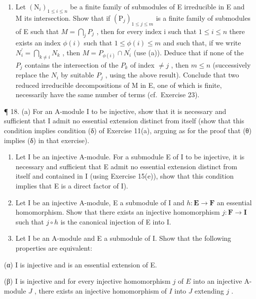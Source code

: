 \begin{enumerate}
\def\labelenumi{(\alph{enumi})}
\setcounter{enumi}{1}
\tightlist
\item
  Let \((\mathrm{N}_{i})_{1\leqslant i\leqslant n}\) be a finite family of submodules of E irreducible in E and M its intersection. Show that if \((\mathrm{P}_{j})_{1\leqslant j\leqslant m}\) is a finite family of submodules of E such that \(M=\bigcap_{j}P_{j}\) , then for every index i such that \(1\leqslant i\leqslant n\) there exists an index \(\phi(i)\) such that \(1\leqslant\phi(i)\leqslant m\) and such that, if we write \(N_{i}^{\prime}=\bigcap_{k\neq i}N_{k}\) , then \(M=P_{\phi(i)}\cap N_{i}^{\prime}\) (use (a)). Deduce that if none of the \(P_{j}\) contains the intersection of the \(P_{k}\) of index \(\neq j\) , then \(m\leqslant n\) (successively replace the \(N_{i}\) by suitable \(P_{j}\) , using the above result). Conclude that two reduced irreducible decompositions of M in E, one of which is finite, necessarily have the same number of terms (cf.~Exercise 23).
\end{enumerate}

¶ 18. (a) For an A-module I to be injective, show that it is necessary and sufficient that I admit no essential extension distinct from itself (show that this condition implies condition (δ) of Exercise 11(a), arguing as for the proof that (θ) implies (δ) in that exercise).

\begin{enumerate}
\def\labelenumi{(\alph{enumi})}
\setcounter{enumi}{1}
\item
  Let I be an injective A-module. For a submodule E of I to be injective, it is necessary and sufficient that E admit no essential extension distinct from itself and contained in I (using Exercise 15(e)), show that this condition implies that E is a direct factor of I).
\item
  Let I be an injective A-module, E a submodule of I and \(h: \mathbf{E} \to \mathbf{F}\) an essential homomorphism. Show that there exists an injective homomorphism \(j: \mathbf{F} \to \mathbf{I}\) such that \(j \circ h\) is the canonical injection of E into I.
\item
  Let I be an A-module and E a submodule of I. Show that the following properties are equivalent:
\end{enumerate}

(α) I is injective and is an essential extension of E.

(β) I is injective and for every injective homomorphism \(j\) of \(E\) into an injective A-module \(J\) , there exists an injective homomorphism of \(I\) into \(J\) extending \(j\) .

